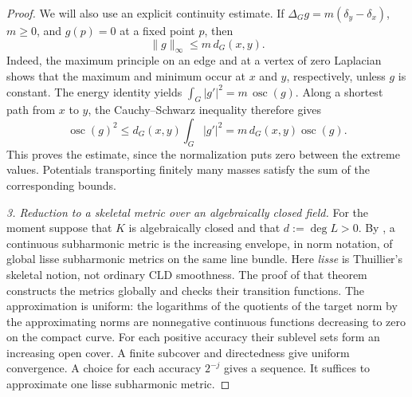 \begin{proof}
We will also use an explicit continuity estimate.  If
$\Delta_G g=m(\delta_y-\delta_x)$, $m\geq0$, and $g(p)=0$ at a
fixed point $p$, then
\begin{equation}
\label{eq:p081-corrected-transport-bound}
                 \lVert g\rVert_\infty\leq m\,d_G(x,y).
\end{equation}
Indeed, the maximum principle on an edge and at a vertex of zero
Laplacian shows that the maximum and minimum occur at $x$ and $y$,
respectively, unless $g$ is constant.  The energy identity yields
$\int_G|g'|^2=m\,\operatorname{osc}(g)$.
Along a shortest path from $x$ to $y$, the Cauchy--Schwarz inequality
therefore gives
\[
 \operatorname{osc}(g)^2
 \leq d_G(x,y)\int_G|g'|^2
 =m\,d_G(x,y)\operatorname{osc}(g).
\]
This proves the estimate, since the normalization puts zero between
the extreme values.  Potentials transporting finitely many masses
satisfy the sum of the corresponding bounds.

\emph{3. Reduction to a skeletal metric over an algebraically closed
field.}
For the moment suppose that $K$ is algebraically closed and that
$d:=\deg L>0$.  By \cite[Theorem~3.4.19]{Thu05}, a continuous
subharmonic metric is the increasing envelope, in norm notation, of
global lisse subharmonic metrics on the same line bundle.  Here
\emph{lisse} is Thuillier's skeletal notion, not ordinary CLD
smoothness.  The proof of that theorem constructs the metrics globally
and checks their transition functions.  The approximation is uniform:
the logarithms of the quotients of the target norm by the approximating
norms are nonnegative continuous functions decreasing to zero on the
compact curve.  For each positive accuracy their sublevel sets form an
increasing open cover.  A finite subcover and directedness give uniform
convergence.  A choice for each accuracy $2^{-j}$ gives a sequence.
It suffices to approximate one lisse subharmonic metric.


\end{proof}
